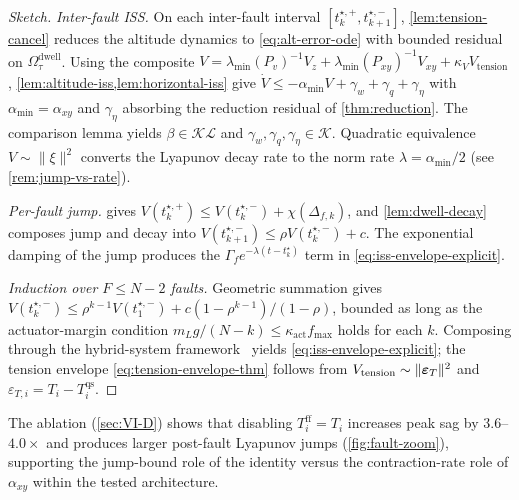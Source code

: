 \begin{proof}[Sketch]
\textit{Inter-fault ISS.} On each inter-fault interval $[t_k^{\star,+},t_{k+1}^{\star,-}]$, \cref{lem:tension-cancel} reduces the altitude dynamics to \eqref{eq:alt-error-ode} with bounded residual on $\Omega_\tau^{\mathrm{dwell}}$. Using the composite $V=\lambda_{\min}(P_v)^{-1}V_z+\lambda_{\min}(P_{xy})^{-1}V_{xy}+\kappa_V V_{\mathrm{tension}}$, \cref{lem:altitude-iss,lem:horizontal-iss} give $\dot V\le-\alpha_{\min}V+\gamma_w+\gamma_q+\gamma_\eta$ with $\alpha_{\min}=\alpha_{xy}$ and $\gamma_\eta$ absorbing the reduction residual of \cref{thm:reduction}. The comparison lemma yields $\beta\in\mathcal{KL}$ and $\gamma_w,\gamma_q,\gamma_\eta\in\mathcal{K}$. Quadratic equivalence $V\sim\|\xi\|^2$ converts the Lyapunov decay rate to the norm rate $\lambda=\alpha_{\min}/2$ (see \cref{rem:jump-vs-rate}).

\textit{Per-fault jump.}  gives $V(t_k^{\star,+})\le V(t_k^{\star,-})+\chi(\Delta_{f,k})$, and \cref{lem:dwell-decay} composes jump and decay into $V(t_{k+1}^{\star,-})\le\rho V(t_k^{\star,-})+c$. The exponential damping of the jump produces the $\Gamma_f e^{-\lambda(t-t_k^\star)}$ term in \eqref{eq:iss-envelope-explicit}.

\textit{Induction over $F\le N-2$ faults.} Geometric summation gives $V(t_k^{\star,-})\le\rho^{k-1}V(t_1^{\star,-})+c(1-\rho^{k-1})/(1-\rho)$, bounded as long as the actuator-margin condition $m_L g/(N-k)\le\kappa_{\mathrm{act}}f_{\max}$ holds for each $k$. Composing through the hybrid-system framework~\cite[Thm.~1]{GoebelSanfeliceTeel2012} yields \eqref{eq:iss-envelope-explicit}; the tension envelope \eqref{eq:tension-envelope-thm} follows from $V_{\mathrm{tension}}\sim\|\boldsymbol{\varepsilon}_T\|^2$ and $\varepsilon_{T,i}=T_i-T_i^{\mathrm{qs}}$.
\end{proof}

\begin{remark}
\label{rem:jump-vs-rate}
The ablation (\cref{sec:VI-D}) shows that disabling $T_i^{\mathrm{ff}}=T_i$ increases peak sag by $3.6$--$4.0\times$ and produces larger post-fault Lyapunov jumps (\cref{fig:fault-zoom}), supporting the jump-bound role of the identity versus the contraction-rate role of $\alpha_{xy}$ within the tested architecture.
\end{remark}

